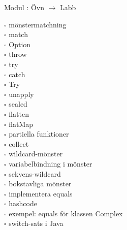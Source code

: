 
    Modul : Övn  $\rightarrow$ Labb 
    \begin{multicols}{3}\SlideFontTiny
    $\square$ mönstermatchning \\
$\square$ match \\
$\square$ Option \\
$\square$ throw \\
$\square$ try \\
$\square$ catch \\
$\square$ Try \\
$\square$ unapply \\
$\square$ sealed \\
$\square$ flatten \\
$\square$ flatMap \\
$\square$ partiella funktioner \\
$\square$ collect \\
$\square$ wildcard-mönster \\
$\square$ variabelbindning i mönster \\
$\square$ sekvens-wildcard \\
$\square$ bokstavliga mönster \\
$\square$ implementera equals \\
$\square$ hashcode \\
$\square$ exempel: equals för klassen Complex \\
$\square$ switch-sats i Java \\
    \end{multicols}
    